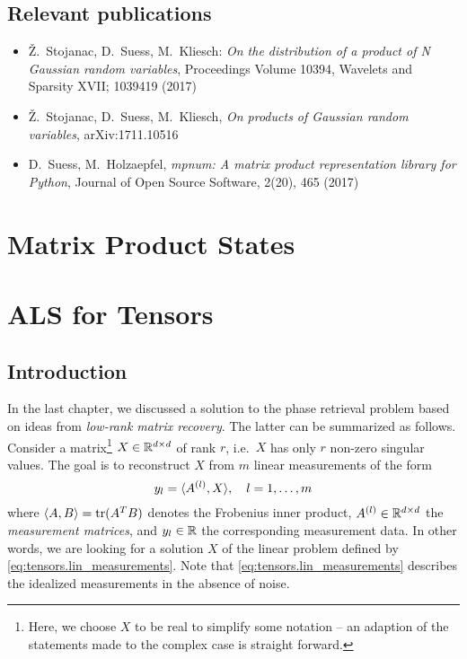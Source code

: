 \subsection*{Relevant publications}
\begin{itemize}
  \item Ž.\ Stojanac, D.\ Suess, M.\ Kliesch: \textit{On the distribution of a product of N Gaussian random variables}, Proceedings Volume 10394, Wavelets and Sparsity XVII; 1039419 (2017)
  \item Ž.\ Stojanac, D.\ Suess, M.\ Kliesch, \textit{On products of Gaussian random variables}, arXiv:1711.10516
  \item D.\ Suess, M.\ Holzaepfel, \textit{mpnum: A matrix product representation library for Python}, Journal of Open Source Software, 2(20), 465 (2017)
\end{itemize}
\section{Matrix Product States}%
\label{sec:tensors.mps}


\section{ALS for Tensors}%
\label{sec:tensors.als}

\subsection{Introduction}
\label{sub:tensors.als.introduction}

In the last chapter, we discussed a solution to the phase retrieval problem based on ideas from \emph{low-rank matrix recovery}.
The latter can be summarized as follows.
Consider a matrix\footnote{%
  Here, we choose $X$ to be real to simplify some notation -- an adaption of the statements made to the complex case is straight forward.
}
$X \in {\mathbb{R}}^{d \times d}$ of rank $r$, i.e.\ $X$ has only $r$ non-zero singular values.
The goal is to reconstruct $X$ from $m$ linear measurements of the form
\[
  y_l = {\braket{A^{(l)}, X}}, \quad l=1,\ldots,m
  \label{eq:tensors.lin_measurements}
\]
where $\braket{A, B} = \operatorname{tr} ({{A}^T} B)$ denotes the Frobenius inner product, $A^{(l)} \in {\mathbb{R}}^{d \times d}$ the \emph{measurement matrices}, and $y_l \in {\mathbb{R}}$ the corresponding measurement data.
In other words, we are looking for a solution $X$ of the linear problem defined by \cref{eq:tensors.lin_measurements}.
Note that \cref{eq:tensors.lin_measurements} describes the idealized measurements in the absence of noise.

